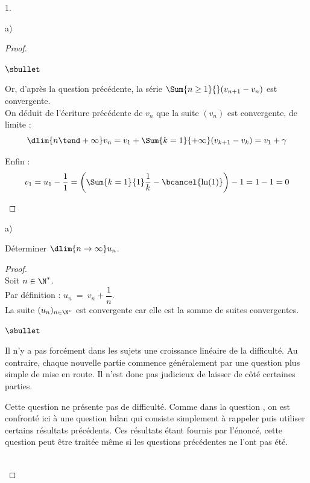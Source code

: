 \begin{noliste}{1.}
\begin{noliste}{a)}
\begin{proof}
\begin{noliste}{$\sbullet$}
      \item Or, d'après la question précédente, la série $\Sum{n \geq
          1}{} (v_{n+1} - v_n)$ est convergente.\\
        On déduit de l'écriture précédente de $v_n$ que la suite
        $(v_n)$ est convergente, de limite :
        \[
        \dlim{n \tend +\infty} v_n = v_1 + \Sum{k=1}{+\infty} (v_{k+1}
        - v_k) = v_1 + \gamma
        \]

      \item Enfin :
        \[
        v_1 = u_1 - \dfrac{1}{1} = \left(\Sum{k=1}{1} \dfrac{1}{k} -
          \bcancel{\ln(1)} \right) - 1 = 1 - 1 = 0
        \]
      \end{noliste}
    \end{proof}

  \end{noliste}

\item 
  \begin{noliste}{a)} 
    \setlength{\itemsep}{2mm}
  \item Déterminer $ \dlim{n \to \infty} u_{n}$.

    \begin{proof}~\\%
      Soit $n \in \N^*$.\\
      Par définition : $u_n \ = \ v_n + \dfrac{1}{n}$.\\
      La suite $(u_n)_{n \in \N^*}$ est convergente car elle est la
      somme de suites convergentes.%
      \begin{remarkL}{.97}%
        \begin{noliste}{$\sbullet$}
        \item Il n’y a pas forcément dans les sujets une croissance
          linéaire de la difficulté. Au contraire, chaque nouvelle
          partie commence généralement par une question plus simple de
          mise en route. Il n’est donc pas judicieux de laisser de
          côté certaines parties.
        \item Cette question  ne présente pas de
          difficulté. Comme dans la question , on est
          confronté ici à une question bilan qui consiste simplement à
          rappeler puis utiliser certains résultats précédents. Ces
          résultats étant fournis par l'énoncé, cette question peut
          être traitée même si les questions précédentes ne l'ont pas
          été.
        \end{noliste}
      \end{remarkL}~\\[-1.3cm]
    \end{proof}


\end{noliste}
\end{noliste}
